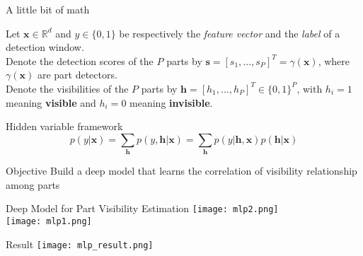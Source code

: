 \begin{frame}{A little bit of math}

Let $\mathbf{x}\in\mathbb{R}^d$ and $y\in\lbrace0,1\rbrace$ be respectively the \textit{feature vector} and the \textit{label} of a detection window.\\
\vspace{3mm}
\pause
Denote the detection scores of the $P$ parts by $\mathbf{s} = [s_1,...,s_P]^T = \gamma(\mathbf{x})$, where $\gamma(\mathbf{x})$ are part detectors.\\
\vspace{3mm}
\pause
Denote the visibilities of the $P$ parts by $\mathbf{h} = [h_1,...,h_P]^T \in\lbrace0,1\rbrace^P$, with $h_i = 1$ meaning \textbf{visible} and $h_i = 0$ meaning \textbf{invisible}.

\end{frame}


\begin{frame}{Hidden variable framework}
\begin{equation}
  p(y\vert\mathbf{x}) = \sum_\mathbf{h}p(y,\mathbf{h}\vert\mathbf{x}) = \sum_\mathbf{h}p(y\vert\mathbf{h},\mathbf{x})p(\mathbf{h}\vert\mathbf{x})
\end{equation}


\pause
{}
\begin{block}{Objective}
  Build a deep model that learns the correlation of visibility
   relationship among parts
\end{block}

\end{frame}

\begin{frame}{Deep Model for Part Visibility Estimation}
\centering
\texttt{[image: mlp2.png]}
\\
\texttt{[image: mlp1.png]}
\end{frame}

\begin{frame}{Result}
  \texttt{[image: mlp\_result.png]}
\end{frame}
